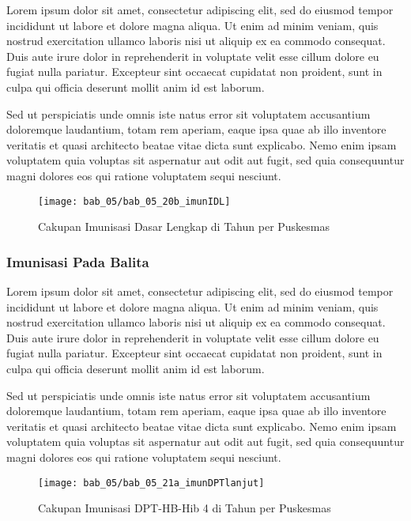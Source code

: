 Lorem ipsum dolor sit amet, consectetur adipiscing elit, sed do eiusmod tempor incididunt ut labore et dolore magna aliqua. Ut enim ad minim veniam, quis nostrud exercitation ullamco laboris nisi ut aliquip ex ea commodo consequat. Duis aute irure dolor in reprehenderit in voluptate velit esse cillum dolore eu fugiat nulla pariatur. Excepteur sint occaecat cupidatat non proident, sunt in culpa qui officia deserunt mollit anim id est laborum.

Sed ut perspiciatis unde omnis iste natus error sit voluptatem accusantium doloremque laudantium, totam rem aperiam, eaque ipsa quae ab illo inventore veritatis et quasi architecto beatae vitae dicta sunt explicabo. Nemo enim ipsam voluptatem quia voluptas sit aspernatur aut odit aut fugit, sed quia consequuntur magni dolores eos qui ratione voluptatem sequi nesciunt.

\begin{figure}[H]
    \centering
    \texttt{[image: bab\_05/bab\_05\_20b\_imunIDL]}
    \caption{Cakupan Imunisasi Dasar Lengkap di \namaKabupaten Tahun \tP per Puskesmas}
    \label{fig:Cakupan-Imunisasi-IDL}
\end{figure}

\subsubsection{Imunisasi Pada Balita}
Lorem ipsum dolor sit amet, consectetur adipiscing elit, sed do eiusmod tempor incididunt ut labore et dolore magna aliqua. Ut enim ad minim veniam, quis nostrud exercitation ullamco laboris nisi ut aliquip ex ea commodo consequat. Duis aute irure dolor in reprehenderit in voluptate velit esse cillum dolore eu fugiat nulla pariatur. Excepteur sint occaecat cupidatat non proident, sunt in culpa qui officia deserunt mollit anim id est laborum.

Sed ut perspiciatis unde omnis iste natus error sit voluptatem accusantium doloremque laudantium, totam rem aperiam, eaque ipsa quae ab illo inventore veritatis et quasi architecto beatae vitae dicta sunt explicabo. Nemo enim ipsam voluptatem quia voluptas sit aspernatur aut odit aut fugit, sed quia consequuntur magni dolores eos qui ratione voluptatem sequi nesciunt.

\begin{figure}[H]
    \centering
    \texttt{[image: bab\_05/bab\_05\_21a\_imunDPTlanjut]}
    \caption{Cakupan Imunisasi DPT-HB-Hib 4 di \namaKabupaten Tahun \tP per Puskesmas}
    \label{fig:Cakupan-Imunisasi-DPT4}
\end{figure}

